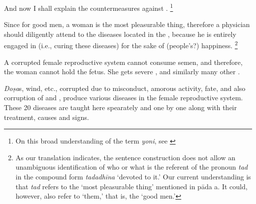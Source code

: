 \begin{translation}

\item [1] And now I shall explain the countermeasures against .%
	\footnote{%
	On this broad understanding of the term \emph{yoni}, see \cite[pp.\ 
	572--5]{das-orig}}

\item [2] Since for good men, a woman is the most pleasurable thing, therefore a physician should diligently attend to the diseases located in the , because he is entirely engaged in (i.e., curing these diseases) for the sake of (people's?) happiness.%
	\footnote{%
	As our translation indicates, the sentence construction does not allow an 
	unambiguous identification of who or what is the referent of the pronoun 
	\textit{tad} in the compound form \emph{tadadhīna} ‘devoted to it.’ Our 
	current understanding is that \emph{tad} refers to the ‘most pleasurable thing’ 
	mentioned in pāda a. It could, however, also refer to ‘them,’ that is, the ‘good 
	men.’%
	}

\item [3] A corrupted female reproductive system cannot consume semen, and 
therefore, the woman cannot hold the fetus. She gets severe 
, 
 and similarly many other 
.


\item [4] \emph{Doṣa}s, wind, etc., corrupted due to 
misconduct, amorous activity, fate, and also corruption of  and 
\se{bīja}{semen}, produce various diseases in the female reproductive system. 
These 20 diseases are taught here spearately and one by one along with their 
treatment, causes and signs.


\end{translation}
